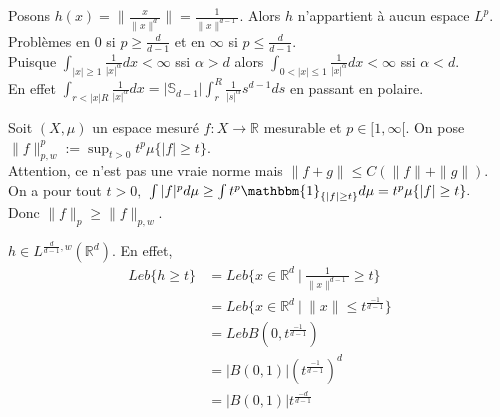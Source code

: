 \begin{remarque}
    Posons $h(x)=\|\frac{x}{\|x\|^d}\|=\frac{1}{\|x\|^{d-1}}$. Alors $h$ n'appartient à aucun espace $L^p$. Problèmes en 0 si $p\ge \frac{d}{d-1}$ et en $\infty $ si $p\le \frac{d}{d-1}$. \\
    Puisque $\int_{|x| \ge 1}\frac{1}{|x| ^\alpha }dx<\infty $ ssi $\alpha >d$ alors $\int_{0<|x| \le 1}\frac{1}{|x| ^\alpha }dx<\infty $ ssi $\alpha <d$.\\
    En effet $\int_{r<|x| R}\frac{1}{|x| ^\alpha }dx=|\mathbb{S}_{d-1}|\int_{r}^{R} \frac{1}{|s| ^\alpha }s^{d-1}ds  $ en passant en polaire.
\end{remarque}
\begin{definition}
     Soit $(X,\mu)$ un espace mesuré $f:X\to \mathbb{R} $ mesurable et $p\in [1,\infty [.$ On pose $\|f\|^p_{p,w}:=\sup_{t>0}t^p\mu \{|f| \ge t\} $.\\
     Attention, ce n'est pas une vraie norme mais $\|f+g\|\le C\left( \|f\|+\|g\| \right) $.\\
     On a pour tout $t>0,$ $\int|f| ^pd\mu\ge  \int t^p\mathbbm{1}_{\{|f| \ge t\}} d\mu=t^p\mu \{|f| \ge t\} .$ \\
     Donc $\|f\|_p\ge \|f\|_{p,w}.$
\end{definition}
\begin{ex}
    $h\in L^{\frac{d}{d-1},w}(\mathbb{R} ^d).$ En effet, 
    \begin{align*}
        Leb \{h\ge t\} &=Leb \{x\in \mathbb{R} ^d\ |\ \frac{1}{\|x\|^{d-1}}\ge t\} \\
        &=Leb \{x\in \mathbb{R} ^d\ |\ \|x\|\le t^{\frac{-1}{d-1}}\}\\
        &=Leb B(0,t^{\frac{-1}{d-1}})\\
        &=|B(0,1)| \left( t^{\frac{-1}{d-1}} \right) ^d\\
        &=|B(0,1)| t^{\frac{-d}{d-1}}
    \end{align*}
\end{ex}

